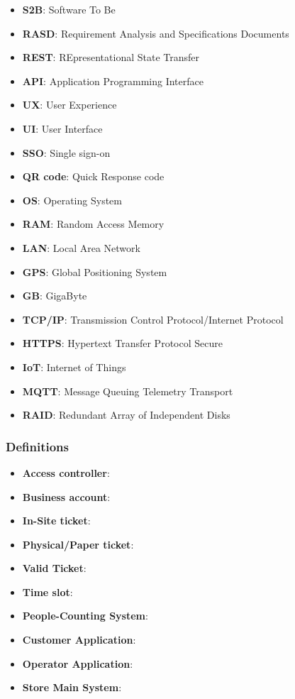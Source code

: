 \begin{itemize}
      \item \textbf{S2B}: Software To Be
      \item \textbf{RASD}: Requirement Analysis and Specifications Documents
      \item \textbf{REST}: REpresentational State Transfer
      \item \textbf{API}: Application Programming Interface
      \item \textbf{UX}: User Experience
      \item \textbf{UI}: User Interface
      \item \textbf{SSO}: Single sign-on
      \item \textbf{QR code}: Quick Response code
      \item \textbf{OS}: Operating System
      \item \textbf{RAM}: Random Access Memory
      \item \textbf{LAN}: Local Area Network
      \item \textbf{GPS}: Global Positioning System
      \item \textbf{GB}: GigaByte
      \item \textbf{TCP/IP}: Transmission Control Protocol/Internet Protocol
      \item \textbf{HTTPS}: Hypertext Transfer Protocol Secure
      \item \textbf{IoT}: Internet of Things
      \item \textbf{MQTT}: Message Queuing Telemetry Transport
      \item \textbf{RAID}: Redundant Array of Independent Disks


\end{itemize}

\subsubsection{Definitions}
\begin{itemize}
      \item \textbf{Access controller}:
      \item \textbf{Business account}:
      \item \textbf{In-Site ticket}:
      \item \textbf{Physical/Paper ticket}:
      \item \textbf{Valid Ticket}:
      \item \textbf{Time slot}:
      \item \textbf{People-Counting System}:
      \item \textbf{Customer Application}:
      \item \textbf{Operator Application}:
      \item \textbf{Store Main System}:
\end{itemize}

